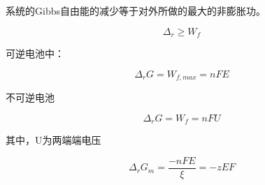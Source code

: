 系统的Gibbs自由能的减少等于对外所做的最大的非膨胀功。

    \[
        \Delta_r \geq W_f  
    \]

    可逆电池中：

    \[
        \Delta_r G = W_{f, max} = nFE  
    \]

    不可逆电池

    \[
        \Delta_r G = W_{f} = nFU 
    \]

    其中，U为两端端电压


    \[
        \Delta_r G_m = \frac{-nFE}{\xi} = -zEF
    \]